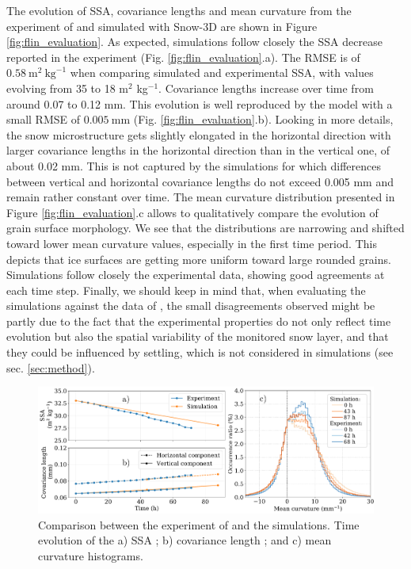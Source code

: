 \documentclass[draft,ms]{agujournal2019}
\begin{document}
The evolution of SSA, covariance lengths and mean curvature from the experiment of  and simulated with Snow-3D are shown in Figure \ref{fig:flin_evaluation}. As expected, simulations follow closely the SSA decrease reported in the experiment (Fig. \ref{fig:flin_evaluation}.a).
The RMSE is of $0.58\ \mathrm{m}^2\ \mathrm{kg}^{-1}$ when comparing simulated and experimental SSA, with values evolving from 35 to 18 m$^2$ kg$^{-1}$.
Covariance lengths increase over time from around 0.07 to 0.12 mm. This evolution is well reproduced by the model with a small RMSE of $0.005\ \mathrm{mm}$ (Fig. \ref{fig:flin_evaluation}.b). Looking in more details, the snow microstructure gets slightly elongated in the horizontal direction with larger covariance lengths in the horizontal direction than in the vertical one, of about 0.02 mm. This is not captured by the simulations for which differences between vertical and horizontal covariance lengths do not exceed 0.005 mm and remain rather constant over time. 
The mean curvature distribution presented in Figure \ref{fig:flin_evaluation}.c allows to qualitatively compare the evolution of grain surface morphology. We see that the distributions are narrowing and shifted toward lower mean curvature values, especially in the first time period. This depicts that ice surfaces are getting more uniform toward large rounded grains. Simulations follow closely the experimental data, showing good agreements at each time step. Finally, we should keep in mind that, when evaluating the simulations against the data of , the small disagreements observed might be partly due to the fact that the experimental properties do not only reflect time evolution but also the spatial variability of the monitored snow layer, and that they could be influenced by settling, which is not considered in simulations (see sec. \ref{sec:method}).\\

\begin{figure}
    \centering
    \includegraphics[width=\linewidth]{Figures/microstruct_EBONI_exp_simu.pdf}
    \caption{Comparison between the experiment of \protect{} and the simulations. Time evolution of the a) SSA ; b) covariance length ; and c) mean curvature histograms.}
    \label{fig:eboni}
\end{figure}
\end{document}
